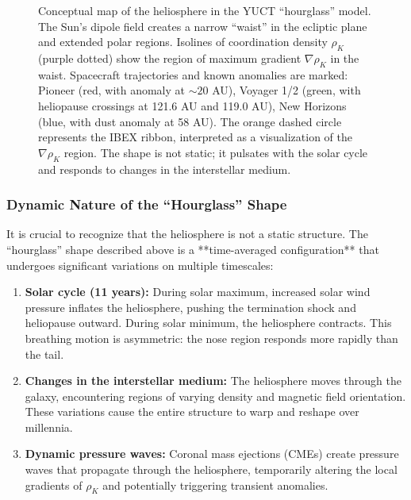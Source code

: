 \documentclass[12pt,a4paper]{article}
\theoremstyle{remark}
\begin{document}
\begin{figure}[htbp]
\begin{tikzpicture}
		\end{tikzpicture}
		\caption{Conceptual map of the heliosphere in the YUCT ``hourglass'' model. The Sun's dipole field creates a narrow ``waist'' in the ecliptic plane and extended polar regions. Isolines of coordination density \(\rho_K\) (purple dotted) show the region of maximum gradient $\nabla\rho_K$ in the waist. Spacecraft trajectories and known anomalies are marked: Pioneer (red, with anomaly at $\sim20$ AU), Voyager 1/2 (green, with heliopause crossings at 121.6 AU and 119.0 AU), New Horizons (blue, with dust anomaly at 58 AU). The orange dashed circle represents the IBEX ribbon, interpreted as a visualization of the $\nabla\rho_K$ region. The shape is not static; it pulsates with the solar cycle and responds to changes in the interstellar medium.}
		\label{fig:coord:heliosphere_hourglass}
	\end{figure}
	
	\subsubsection{Dynamic Nature of the ``Hourglass'' Shape}
	\label{subsubsec:coord:dynamic}
	
	It is crucial to recognize that the heliosphere is not a static structure. The ``hourglass'' shape described above is a **time-averaged configuration** that undergoes significant variations on multiple timescales:
	
	\begin{enumerate}
		\item \textbf{Solar cycle (11 years):} During solar maximum, increased solar wind pressure inflates the heliosphere, pushing the termination shock and heliopause outward. During solar minimum, the heliosphere contracts. This breathing motion is asymmetric: the nose region responds more rapidly than the tail.
		
		\item \textbf{Changes in the interstellar medium:} The heliosphere moves through the galaxy, encountering regions of varying density and magnetic field orientation. These variations cause the entire structure to warp and reshape over millennia.
		
		\item \textbf{Dynamic pressure waves:} Coronal mass ejections (CMEs) create pressure waves that propagate through the heliosphere, temporarily altering the local gradients of \(\rho_K\) and potentially triggering transient anomalies.
	\end{enumerate}
	
\end{document}
